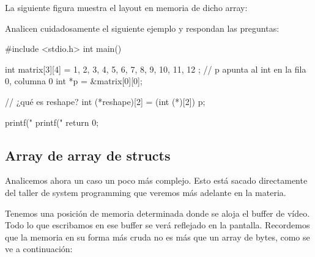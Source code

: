 \documentclass[]{scrartcl}
\begin{document}
La siguiente figura muestra el layout en memoria de dicho array:

\begin{center}
  \noindent {}
  \label{fig:matrix}
\end{center}

\begin{exbox}
Analicen cuidadosamente el siguiente ejemplo y respondan las preguntas:
\begin{cbox}[]{}
  #include <stdio.h>
  int main() {
      int matrix[3][4] = {
          {1, 2, 3, 4},
          {5, 6, 7, 8},
          {9, 10, 11, 12}
          };
      // p apunta al int en la fila 0, columna 0
      int *p = &matrix[0][0]; 

      // ¿qué es reshape?
      int (*reshape)[2] = (int (*)[2]) p; 

      printf("%
      printf("%
      return 0;
  }
\end{cbox}
\end{exbox}

\subsection*{Array de array de structs}

Analicemos ahora un caso un poco más complejo. Esto está sacado directamente del taller de system programming que veremos más adelante en la materia. 

Tenemos una posición de memoria determinada donde se aloja el buffer de vídeo. Todo lo que escribamos en ese buffer se verá reflejado en la pantalla. Recordemos que la memoria en su forma más cruda no es más que un array de bytes, como se ve a continuación:
\end{document}

